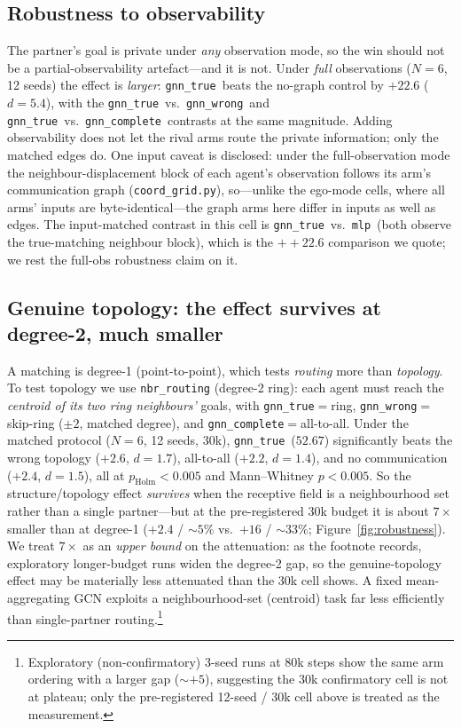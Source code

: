 \documentclass[10pt]{article}
\newcommand{\gtrue}{\texttt{gnn\_true}}
\newcommand{\gwrong}{\texttt{gnn\_wrong}}
\newcommand{\gcomplete}{\texttt{gnn\_complete}}
\newcommand{\mlpc}{\texttt{mlp}}
\newcommand{\SCfullGap}{+22.6}        %
\newcommand{\SCfullD}{5.4}
\newcommand{\SCnbrTrue}{52.67}
\newcommand{\SCnbrTwGap}{+2.6}        %
\newcommand{\SCnbrTwD}{1.7}
\newcommand{\SCnbrTcGap}{+2.2}        %
\newcommand{\SCnbrTcD}{1.4}
\newcommand{\SCnbrTmGap}{+2.4}        %
\newcommand{\SCnbrTmD}{1.5}
\newcommand{\SCnbrPHolm}{0.005}       %
\newcommand{\SCnbrShrink}{7}          %
\begin{document}
\subsection{Robustness to observability}
\label{sec:structure:obs}

The partner's goal is private under \emph{any} observation mode, so the win
should not be a partial-observability artefact---and it is not. Under
\emph{full} observations ($N{=}6$, 12 seeds) the effect is \emph{larger}:
\gtrue\ beats the no-graph control by $\SCfullGap$ ($d=\SCfullD$), with the
\gtrue\ vs.\ \gwrong\ and \gtrue\ vs.\ \gcomplete\ contrasts at the same
magnitude. Adding observability does not let the rival arms route the private
information; only the matched edges do. One input caveat is disclosed: under
the full-observation mode the neighbour-displacement block of each agent's
observation follows its arm's communication graph
(\texttt{coord\_grid.py}), so---unlike the ego-mode cells, where all arms'
inputs are byte-identical---the graph arms here differ in inputs as well as
edges. The input-matched contrast in this cell is \gtrue\ vs.\ \mlpc\ (both
observe the true-matching neighbour block), which is the $+\SCfullGap$
comparison we quote; we rest the full-obs robustness claim on it.

\subsection{Genuine topology: the effect survives at degree-2, much smaller}
\label{sec:structure:degree2}

A matching is degree-1 (point-to-point), which tests \emph{routing} more than
\emph{topology}. To test topology we use \texttt{nbr\_routing} (degree-2
ring): each agent must reach the \emph{centroid of its two ring neighbours'}
goals, with \gtrue${}={}$ring, \gwrong${}={}$skip-ring ($\pm2$, matched
degree), and \gcomplete${}={}$all-to-all. Under the matched protocol
($N{=}6$, 12 seeds, 30k), \gtrue\ ($\SCnbrTrue$) significantly beats the
wrong topology ($\SCnbrTwGap$, $d=\SCnbrTwD$), all-to-all ($\SCnbrTcGap$,
$d=\SCnbrTcD$), and no communication ($\SCnbrTmGap$, $d=\SCnbrTmD$), all at
$p_{\text{Holm}}<\SCnbrPHolm$ and Mann--Whitney $p<0.005$. So the
structure/topology effect \emph{survives} when the receptive field is a
neighbourhood set rather than a single partner---but at the pre-registered 30k
budget it is about $\SCnbrShrink\times$ smaller than at degree-1 ($+2.4$ /
${\sim}5\%$ vs.\ $+16$ / ${\sim}33\%$; Figure~\ref{fig:robustness}). We treat $\SCnbrShrink\times$ as an
\emph{upper bound} on the attenuation: as the footnote records, exploratory
longer-budget runs widen the degree-2 gap, so the genuine-topology effect may be
materially less attenuated than the 30k cell shows. A fixed mean-aggregating GCN
exploits a
neighbourhood-set (centroid) task far less efficiently than single-partner
routing.\footnote{Exploratory (non-confirmatory) 3-seed runs at 80k steps show
the same arm ordering with a larger gap (${\sim}+5$), suggesting the 30k
confirmatory cell is not at plateau; only the pre-registered 12-seed / 30k cell
above is treated as the measurement.}
\end{document}
